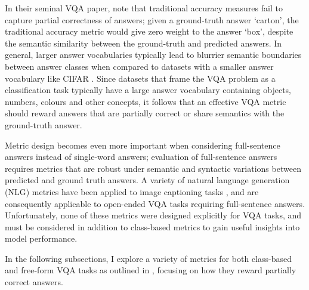 In their seminal VQA paper, \citeauthor{malinowski2014multiworld} \cite{malinowski2014multiworld} note that traditional accuracy measures fail to capture partial correctness of answers; given a ground-truth answer `carton', the traditional accuracy metric would give zero weight to the answer `box', despite the semantic similarity between the ground-truth and predicted answers. In general, larger answer vocabularies typically lead to blurrier semantic boundaries between answer classes when compared to datasets with a smaller answer vocabulary like CIFAR \cite{krizhevsky2009learning}. Since datasets that frame the VQA problem as a classification task typically have a large answer vocabulary containing objects, numbers, colours and other concepts, it follows that an effective VQA metric should reward answers that are partially correct or share semantics with the ground-truth answer.

Metric design becomes even more important when considering full-sentence answers instead of single-word answers; evaluation of full-sentence answers requires metrics that are robust under semantic and syntactic variations between predicted and ground truth answers. A variety of natural language generation (NLG) metrics \cite{papineni2002bleu, lin2004rouge, banerjee2005meteor, vedantam2015cider} have been applied to image captioning tasks \cite{chen2015microsoft, vedantam2015cider}, and are consequently applicable to open-ended VQA tasks requiring full-sentence answers. Unfortunately, none of these metrics were designed explicitly for VQA tasks, and must be considered in addition to class-based metrics to gain useful insights into model performance. 


In the following subsections, I explore a variety of metrics for both class-based and free-form VQA tasks as outlined in \tableautorefname{ \ref{tab:vqa_metrics_suitability}}, focusing on how they reward partially correct answers.


